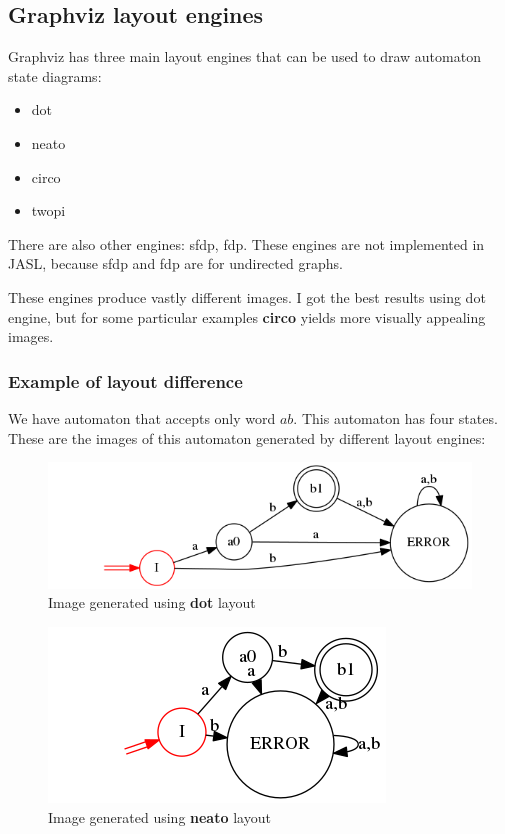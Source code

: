 \documentclass{ctuthesis}
\begin{document}
\subsection{Graphviz layout engines}
Graphviz has three main layout engines that can be used to draw automaton state diagrams:
\begin{itemize}
	\item dot
	\item neato
	\item circo
	\item twopi
\end{itemize}

There are also other engines: sfdp, fdp. These engines are not implemented in JASL, because sfdp and fdp are for undirected graphs.

These engines produce vastly different images. I got the best results using dot engine, but for some particular examples \textbf{circo} yields more visually appealing images.

\subsubsection{Example of layout difference}
We have automaton that accepts only word $ab$. This automaton has four states. These are the images of this automaton generated by different layout engines:

\begin{figure}[H]
\includegraphics[width=0.8\linewidth]{figures/layouts_dot.png}
\caption{Image generated using \textbf{dot} layout}
\label{fig:layout_diff_dot}
\end{figure}

\begin{figure}[H]
\includegraphics[width=0.7\linewidth]{figures/layouts_neato.png}
\caption{Image generated using \textbf{neato} layout}
\label{fig:layout_diff_neato}
\end{figure}
\end{document}
